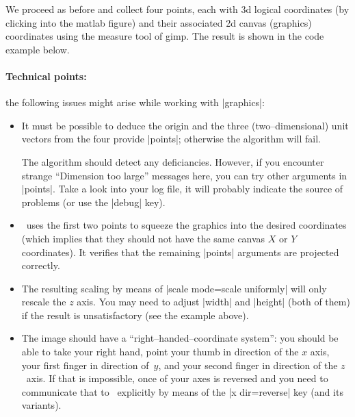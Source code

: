 {{{}%

We proceed as before and collect four points, each with 3d logical coordinates (by clicking into the matlab figure) and their associated 2d canvas (graphics) coordinates using the measure tool of gimp. The result is shown in the code example below.
\begin{codeexample}[]
\end{codeexample}

\paragraph{Technical points:} the following issues might arise while working with  |graphics|:
\begin{itemize}
	\item It must be possible to deduce the origin and the three (two--dimensional) unit vectors from the four provide |points|; otherwise the algorithm will fail. 
	
	The algorithm should detect any deficiancies. However, if you encounter strange ``Dimension too large'' messages here, you can try other arguments in |points|. Take a look into your log file, it will probably indicate the source of problems (or use the |debug| key).

	\item \PGFPlots\ uses the first two points to squeeze the graphics into the desired coordinates (which implies that they should not have the same canvas $X$ or $Y$ coordinates). It verifies that the remaining |points| arguments are projected correctly.
	\item The resulting scaling by means of |scale mode=scale uniformly| will only rescale the $z$ axis. You may need to adjust |width| and |height| (both of them) if the result is unsatisfactory (see the example above).
	
	\item The image should have a ``right--handed--coordinate system'': you should be able to take your right hand, point your thumb in direction of the $x$ axis, your first finger in direction of~$y$, and your second finger in direction of the $z$~axis. If that is impossible, once of your axes is reversed and you need to communicate that to \PGFPlots\ explicitly by means of the |x dir=reverse| key (and its variants).


\end{itemize}}}
